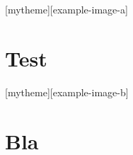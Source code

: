 \documentclass{beamer}
\begin{document}
\begin{frame}[plain,t]
\titlepage
\end{frame}

[mytheme][example-image-a]

\begin{frame}[plain,t]
\titlepage
\end{frame}

\section{Test}

[mytheme][example-image-b]
\section{Bla}
\end{document}
